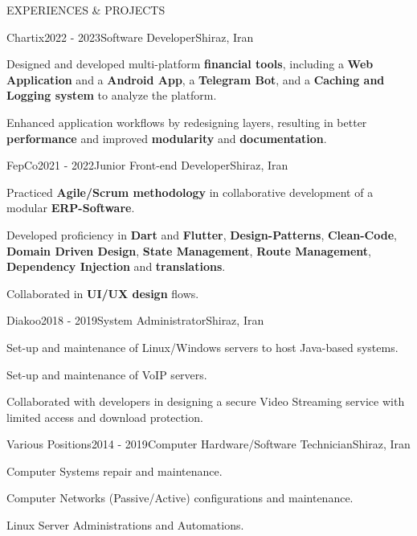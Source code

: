 \documentclass[
    a4paper, %
    12pt, %
]{resume.cls} %
\begin{document}
\begin{rSection}{EXPERIENCES \& PROJECTS}
	\begin{rSubsection}{Chartix}{2022 - 2023}{Software Developer}{Shiraz, Iran}
        \item Designed and developed multi-platform \textbf{financial tools}, including a \textbf{Web Application} and a \textbf{Android App}, a \textbf{Telegram Bot}, and a \textbf{Caching and Logging system} to analyze the platform. 
        \item Enhanced application workflows by redesigning layers, resulting in better \textbf{performance} and improved \textbf{modularity} and \textbf{documentation}.
        \break {}      
	\end{rSubsection}

	\begin{rSubsection}{FepCo}{2021 - 2022}{Junior Front-end Developer}{Shiraz, Iran}
	   	\item Practiced \textbf{Agile/Scrum methodology} in collaborative development of a modular \textbf{ERP-Software}.
        \item Developed proficiency in \textbf{Dart} and \textbf{Flutter}, \textbf{Design-Patterns}, \textbf{Clean-Code},  \textbf{Domain Driven Design}, \textbf{State Management}, \textbf{Route Management}, \textbf{Dependency Injection} and \textbf{translations}.
		\item Collaborated in \textbf{UI/UX design} flows.
        \break {}    
	\end{rSubsection}

	\begin{rSubsection}{Diakoo}{2018 - 2019}{System Administrator}{Shiraz, Iran}
		\item Set-up and maintenance of Linux/Windows servers to host Java-based systems.
        \item Set-up and maintenance of VoIP servers.
        \item Collaborated with developers in designing a secure Video Streaming service with limited access and download protection.
	\end{rSubsection}

    	\begin{rSubsection}{Various Positions}{2014 - 2019}{Computer Hardware/Software Technician}{Shiraz, Iran}
		\item Computer Systems repair and maintenance.
        \item Computer Networks (Passive/Active) configurations and maintenance.
        \item Linux Server Administrations and Automations.
	\end{rSubsection}
\bigskip
\end{rSection}
\end{document}

